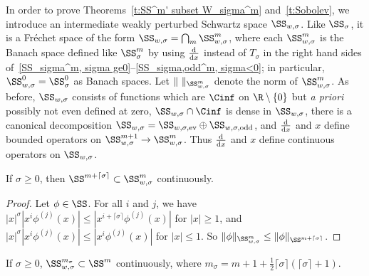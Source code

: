In order to prove Theorems~\ref{t:SS^m' subset W_sigma^m} and~\ref{t:Sobolev}, we introduce an intermediate
weakly perturbed Schwartz space $\SS_{w,\sigma}$. Like $\SS_\sigma$, it is a Fr\'echet space of the form $\SS_{w,\sigma}=\bigcap_m\SS_{w,\sigma}^m$, where each $\SS_{w,\sigma}^m$ is the Banach space def\/ined like $\SS_\sigma^m$ by using  $\frac{{\rm d}}{{\rm d}x}$ instead of $T_\sigma$ in the right hand sides of~\mbox{\eqref{SS_sigma^m, sigma ge0}--\eqref{SS_sigma,odd^m, sigma<0}}; in particular, $\SS_{w,\sigma}^0=\SS_\sigma^0$ as Banach spaces. Let $\|\ \|_{\SS_{w,\sigma}^m}$ denote the norm of $\SS_{w,\sigma}^m$. As before, $\SS_{w,\sigma}$ consists of functions which are $\Cinf$ on $\R\setminus\{0\}$ but \textit{a priori} possibly not even def\/ined at zero, $\SS_{w,\sigma}\cap\Cinf$ is dense in $\SS_{w,\sigma}$, there is a canonical decomposition $\SS_{w,\sigma}=\SS_{w,\sigma,\text{\rm ev}}\oplus\SS_{w,\sigma,\text{\rm odd}}$, and $\frac{{\rm d}}{{\rm d}x}$ and $x$ def\/ine bounded operators on $\SS_{w,\sigma}^{m+1}\to\SS_{w,\sigma}^m$. Thus  $\frac{{\rm d}}{{\rm d}x}$ and $x$ def\/ine continuous operators on $\SS_{w,\sigma}$.

\begin{Lemma}\label{l:SS m+lceil sigma/2 rceil subset SS w,sigma m}
  If $\sigma\ge0$, then $\SS^{m+\lceil\sigma\rceil}\subset\SS_{w,\sigma}^m$ continuously.
\end{Lemma}

\begin{proof}
  Let $\phi\in\SS$. For all $i$ and $j$, we have $|x|^\sigma|x^i\phi^{(j)}(x)|\le|x^{i+\lceil\sigma\rceil}\phi^{(j)}(x)|$ for $|x|\ge1$, and $|x|^\sigma|x^i\phi^{(j)}(x)|\le|x^i\phi^{(j)}(x)|$ for $|x|\le1$. So $\|\phi\|_{\SS_{w,\sigma}^m}\le\|\phi\|_{\SS^{m+\lceil\sigma\rceil}}$.
\end{proof}

\begin{Lemma}\label{l:SS_w,sigma^m' subset SS^m}
  If $\sigma\ge0$, $\SS_{w,\sigma}^{m_\sigma}\subset\SS^m$ continuously, where $m_\sigma=m+1+\frac{1}{2}\lceil\sigma\rceil(\lceil\sigma\rceil+1)$.
\end{Lemma}

